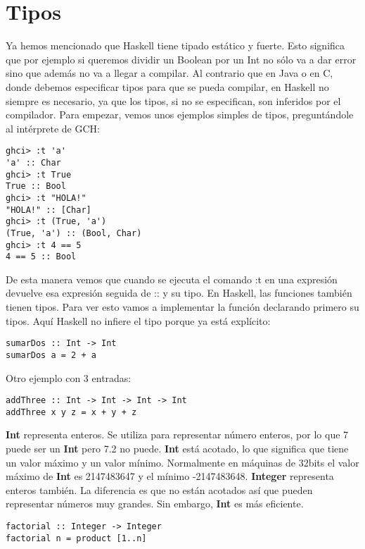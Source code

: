 \section{Tipos} %
\label{sec:tipos}

Ya hemos mencionado que Haskell tiene tipado estático y fuerte. Esto significa que por ejemplo si queremos dividir un Boolean por un Int no sólo va a dar error sino que además no va a llegar a compilar.
Al contrario que en Java o en C, donde debemos especificar tipos para que se pueda compilar, en Haskell no siempre es necesario, ya que los tipos, si no se especifican, son inferidos por el compilador.
Para empezar, vemos unos ejemplos simples de tipos, preguntándole al intérprete de GCH:

\begin{lstlisting}
ghci> :t 'a'
'a' :: Char
ghci> :t True
True :: Bool
ghci> :t "HOLA!"
"HOLA!" :: [Char]
ghci> :t (True, 'a')
(True, 'a') :: (Bool, Char)
ghci> :t 4 == 5
4 == 5 :: Bool
\end{lstlisting}


De esta manera vemos que cuando se ejecuta el comando :t en una expresión devuelve esa expresión seguida de :: y su tipo.
En Haskell, las funciones también tienen tipos. Para ver esto vamos a implementar la función declarando primero su tipos. Aquí Haskell no infiere el tipo porque ya está explícito:

\begin{lstlisting}
sumarDos :: Int -> Int
sumarDos a = 2 + a
\end{lstlisting}

Otro ejemplo con 3 entradas:

\begin{lstlisting}
addThree :: Int -> Int -> Int -> Int
addThree x y z = x + y + z
\end{lstlisting}

\textbf{Int} representa enteros. Se utiliza para representar número enteros, por lo que 7 puede ser un \textbf{Int} pero 7.2 no puede. \textbf{Int} está acotado, lo que significa que tiene un valor máximo y un valor mínimo. Normalmente en máquinas
de 32bits el valor máximo de \textbf{Int} es 2147483647 y el mínimo -2147483648.
\textbf{Integer} representa enteros también. La diferencia es que no están acotados así que pueden representar
números muy grandes. Sin embargo, \textbf{Int} es más eficiente.

\begin{lstlisting}
factorial :: Integer -> Integer
factorial n = product [1..n]
\end{lstlisting}

